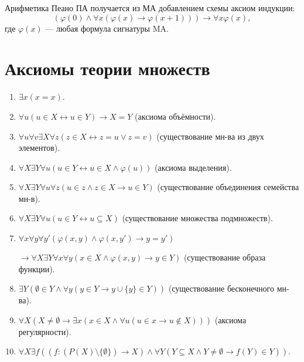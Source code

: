\documentclass[a4paper,11pt]{article}
\begin{document}
\noindent Арифметика Пеано ПА получается из МА добавлением схемы аксиом индукции:
\[(\varphi(0) \wedge \forall
x(\varphi(x) \rightarrow \varphi(x + 1))) \rightarrow \forall x
\varphi(x),\]
где $\varphi(x)$ --- любая формула сигнатуры MA.
 
\section{Аксиомы теории множеств}

\begin{enumerate}
\item $\exists x(x=x)$.

\item $\forall u(u\in X\leftrightarrow u\in Y)\to X=Y$ (аксиома объёмности).

\item $\forall u\forall v\exists X\forall z(z\in X\leftrightarrow z=u\lor z=v)$ (существование мн-ва из двух элементов).

\item $\forall X\exists Y\forall u(u\in Y\leftrightarrow u\in X\land\varphi(u))$ (аксиома выделения).

\item $\forall X\exists Y\forall u\forall z(u\in z\land z\in X\to u\in Y)$ (существование объединения семейства мн-в).

\item $\forall X\exists Y\forall u(u\in Y\leftrightarrow u\subseteq X)$ (существование множества подмножеств).

\item $\forall x\forall y\forall y'(\varphi(x,y)\land\varphi(x,y')\to y=y')$

$\to\forall X\exists Y\forall x\forall y(x\in X\land\varphi(x,y)\to y\in Y)$ (существование образа функции).

\item $\exists Y(\emptyset\in Y\land\forall y(y\in Y\to y\cup\{y\}\in Y))$ (существование бесконечного мн-ва).

\item $\forall X(X\not=\emptyset\to\exists x(x\in X\land\forall u(u\in x\to u\not\in X)))$ (аксиома регулярности).

\item $\forall X\exists f((f:(P(X)\setminus\{\emptyset\})\to X)\land\forall Y(Y\subseteq X\land Y\not=\emptyset\to f(Y)\in Y))$.
\end{enumerate}
\end{document}
